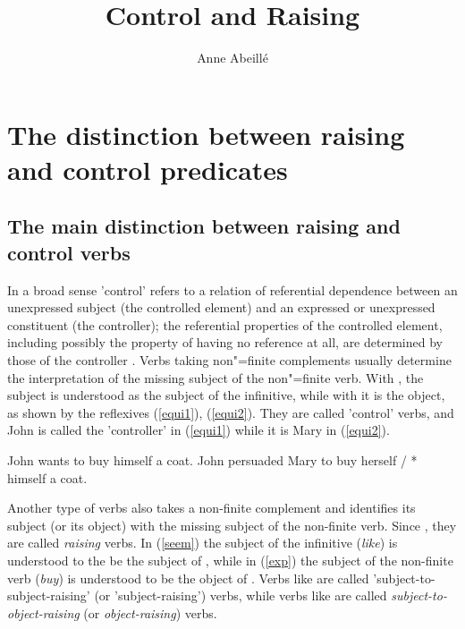 \documentclass[output=paper
	        ,collection
	        ,collectionchapter
 	        ,biblatex
                ,babelshorthands
                ,newtxmath
                ,draftmode
                ,colorlinks, citecolor=brown
]{langscibook}
\author{%
	Anne Abeillé\affiliation{Université de Paris}%
}
\title{Control and Raising}
\begin{document}
\maketitle
\label{chap-control-raising}



\section{The distinction between raising and control predicates}

\subsection{The main distinction between raising and control verbs}
\label{control:sec-distinction-control-raising}

In a broad sense 'control' refers to a relation of referential dependence between an unexpressed
subject (the controlled element) and an expressed or unexpressed constituent (the controller); the
referential properties of the controlled element, including possibly the property of having no
reference at all, are determined by those of the controller \citep[]{Bresnan82c}. Verbs taking non"=finite complements usually determine the interpretation of the missing subject of the non"=finite verb. With , the subject is understood as the subject of the infinitive, while with  it is the object, as shown by the reflexives (\ref{equi1}), (\ref{equi2}). They are called 'control' verbs, and John is called the 'controller' in (\ref{equi1}) while it is Mary in (\ref{equi2}).

	\begin{exe}
	\ex \begin{xlist}
	\ex John wants to buy himself a coat. \label{equi1}
   \ex 	John persuaded Mary to buy herself / * himself a coat.\label{equi2}
 \end{xlist}
 \end{exe}


Another type of verbs also takes a non-finite complement and identifies its subject (or its object) with the missing subject of the non-finite verb. Since \citet{Postal1974}, they are called \emph{raising} verbs. In (\ref{seem}) the subject of the infinitive (\emph{like}) is understood to the be the subject of , while in (\ref{exp}) the subject of the non-finite verb (\emph{buy}) is understood to be the object of . Verbs like  are called 'subject-to-subject-raising' (or 'subject-raising') verbs, while
verbs like  are called \emph{subject-to-object-raising} (or \emph{object-raising}) verbs.
\end{document}
